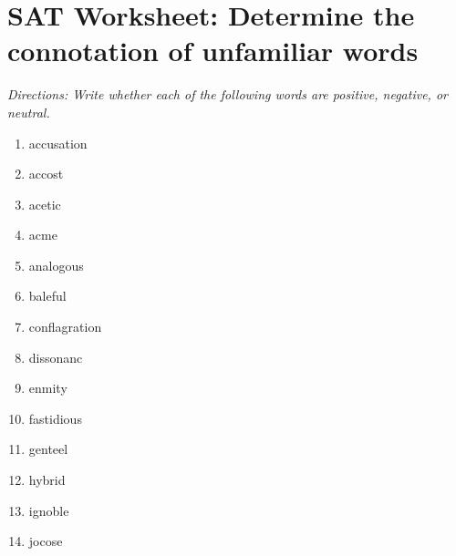 \section{SAT Worksheet: Determine the connotation of unfamiliar words}

\textit{Directions: Write whether each of the following words are positive, negative, or neutral.}

\begin{enumerate}
\item accusation \underline{\hspace{2in}}

\item accost \underline{\hspace{2in}}

\item acetic \underline{\hspace{2in}}

\item acme \underline{\hspace{2in}}

\item analogous  \underline{\hspace{2in}}

\item baleful  \underline{\hspace{2in}}

\item conflagration \underline{\hspace{2in}}

\item dissonanc \underline{\hspace{2in}}

\item enmity \underline{\hspace{2in}}

\item fastidious \underline{\hspace{2in}}

\item genteel \underline{\hspace{2in}}

\item hybrid \underline{\hspace{2in}}

\item ignoble \underline{\hspace{2in}}

\item jocose \underline{\hspace{2in}}


\end{enumerate}
